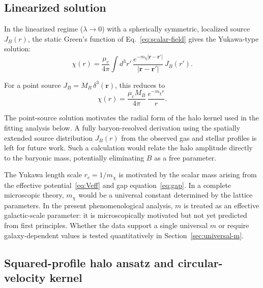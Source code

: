\documentclass[11pt,a4paper]{article}
\begin{document}
\subsection{Linearized solution}

In the linearized regime ($\lambda \to 0$) with a spherically
symmetric, localized source $J_B(r)$, the static Green's function
of Eq.~\eqref{eq:scalar-field} gives the Yukawa-type solution:
\begin{equation}
\chi(r) = \frac{\mu_c}{4\pi}\int d^3r'\,
\frac{e^{-m_\chi|\mathbf{r}-\mathbf{r}'|}}{|\mathbf{r}-\mathbf{r}'|}
\,J_B(r').
\label{eq:yukawa-sol}
\end{equation}

For a point source $J_B = M_B\,\delta^3(\mathbf{r})$, this reduces to
\begin{equation}
\chi(r) = \frac{\mu_c M_B}{4\pi}\,\frac{e^{-m_\chi r}}{r}.
\label{eq:yukawa-point}
\end{equation}

The point-source solution motivates the radial form of the halo
kernel used in the fitting analysis below.
A fully baryon-resolved derivation using the spatially extended
source distribution $J_B(r)$ from the observed gas and stellar
profiles is left for future work.
Such a calculation would relate the halo amplitude directly to
the baryonic mass, potentially eliminating $B$ as a free parameter.

The Yukawa length scale $r_c = 1/m_\chi$ is motivated by the
scalar mass arising from the effective
potential~\eqref{eq:Veff} and gap equation~\eqref{eq:gap}.
In a complete microscopic theory, $m_\chi$ would be a universal
constant determined by the lattice parameters.
In the present phenomenological analysis, $m$ is treated as an
effective galactic-scale parameter: it is microscopically motivated
but not yet predicted from first principles.
Whether the data support a single universal $m$ or require
galaxy-dependent values is tested quantitatively in
Section~\ref{sec:universal-m}.

\subsection{Squared-profile halo ansatz and circular-velocity kernel}
\end{document}

